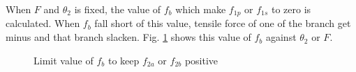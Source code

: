 \documentclass{llncs}
\begin{document}
When $F$ and $\theta_2$ is fixed, the value of $f_b$ which make $f_{1p}$ or $f_{1s}$ to zero is calculated.
When $f_b$ fall short of this value, tensile force of one of the branch get minus and that branch slacken.
Fig. \ref{fig:slack} shows this value of $f_b$ against $\theta_2$ or $F$.
\begin{figure}[tbhp]
	\centering
	\caption{Limit value of $f_b$ to keep $f_{2a}$ or $f_{2b}$ positive}
	\label{fig:slack}
\end{figure}
\end{document}
